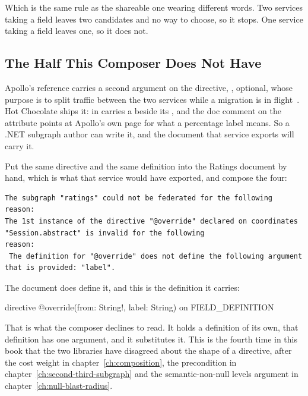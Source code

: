 %
Which is the same rule as the shareable one wearing different words. Two
services taking a field leaves two candidates and no way to choose, so it
stops. One service taking a field leaves one, so it does not.

\subsection{The Half This Composer Does Not Have}

%
Apollo's reference carries a second argument on the directive, ,
optional, whose purpose is to split traffic between the two services while a
migration is in flight~\autocite{apollodirectives}. Hot Chocolate ships it:
 in  carries a
 beside its , and the doc comment on the attribute
points at Apollo's own page for what a percentage label means. So a .NET
subgraph author can write it, and the document that service exports will carry
it.

%
Put the same directive and the same definition into the Ratings document by
hand, which is what that service would have exported, and compose the four:

\begin{verbatim}
The subgraph "ratings" could not be federated for the following reason:
The 1st instance of the directive "@override" declared on coordinates "Session.abstract" is invalid for the following
reason:
 The definition for "@override" does not define the following argument that is provided: "label".
\end{verbatim}

%
The document does define it, and this is the definition it carries:

\begin{graphqlsdl}
directive @override(from: String!, label: String) on FIELD_DEFINITION
\end{graphqlsdl}

That is what the composer declines to read. It holds a definition of its own,
that definition has one argument, and it substitutes it. This is
the fourth time in this book that the two libraries have disagreed about the
shape of a directive, after the cost weight in chapter~\ref{ch:composition},
the  precondition in
chapter~\ref{ch:second-third-subgraph} and the semantic-non-null levels
argument in chapter~\ref{ch:null-blast-radius}.

